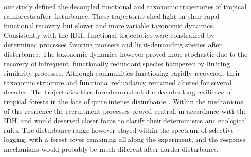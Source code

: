 \documentclass[fleqn,10pt]{ArtEcoFoG} %
\theoremstyle{definition}
\theoremstyle{definition}
\theoremstyle{definition}
\theoremstyle{remark}
\begin{document}
our study defined the decoupled functional and taxonomic trajectories of
tropical rainforests after disturbance. These trajectories shed light on
their rapid functional recovery but slower and more variable taxonomic
dynamics. Consistently with the IDH, functional trajectories were
constrained by determined processes favoring pioneers and
light-demanding species after disturbance. The taxonomic dynamics
however proved more stochastic due to the recovery of infrequent,
functionally redundant species hampered by limiting similarity
processes. Although communities functioning rapidly recovered, their
taxonomic structure and functional redundancy remained altered for
several decades. The trajectories therefore demonstrated a decades-long
resilience of tropical forests in the face of quite intense disturbance
\citep{Gourlet-Fleury2005}. Within the mechanisms of this resilience the
recruitment processes proved central, in accordance with the IDH, and
would deserved closer focus to clarify their determinisms and ecological
rules. The disturbance range however stayed within the spectrum of
selective logging, with a forest cover remaining all along the
experiment, and the response mechanisms would probably be much different
after harder disturbance.



\makeatletter

\makeatother


\end{document}
